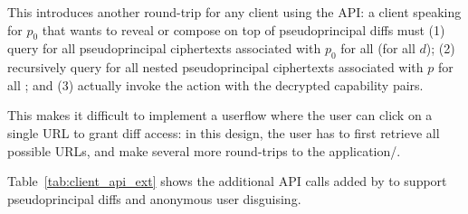 This introduces another round-trip for any client using the API: a client speaking for $p_0$ that
wants to reveal or compose on top of pseudoprincipal diffs must (1) query for all pseudoprincipal
 ciphertexts associated with $p_0$ for all  (for all $d$); (2) recursively
query for all nested pseudoprincipal  ciphertexts associated with $p$ for all ;
and (3) actually invoke the action with the decrypted capability pairs.

This makes it difficult to implement a userflow where the user can click on a single URL to grant
\sys diff access: in this design, the user has to first retrieve all possible URLs, and make several
more round-trips to the application/\sys.

Table~\ref{tab:client_api_ext} shows the additional API calls added by \sys to support
pseudoprincipal diffs and anonymous user disguising. 

